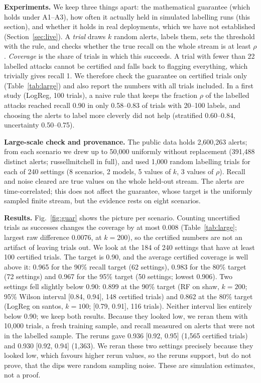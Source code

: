 \documentclass[conference]{IEEEtran}
\begin{document}
\textbf{Experiments.} We keep three things apart: the mathematical guarantee (which holds under
A1--A3), how often it actually held in simulated labelling runs (this section), and whether it
holds in real deployments, which we have not established (Section~\ref{sec:live}). A \emph{trial}
draws $k$ random alerts, labels them, sets the threshold with the rule, and checks whether the true
recall on the whole stream is at least $\rho$. \emph{Coverage} is the share of trials in which
this succeeds. A trial with fewer than 22 labelled attacks cannot be certified and falls back to
flagging everything, which trivially gives recall 1. We therefore check the guarantee on certified
trials only (Table~\ref{tab:large}) and also report the numbers with all trials included. In a first study (LogReg, 100 trials), a naive rule that keeps the fraction $\rho$ of the labelled attacks reached recall 0.90 in only
0.58--0.83 of trials with 20--100 labels, and choosing the alerts to label more cleverly did not help (stratified 0.60--0.84, uncertainty 0.50--0.75).



\textbf{Large-scale check and provenance.} The public data holds 2,600,263 alerts; from each
scenario we drew up to 50,000 uniformly without replacement (391,488 distinct alerts;
russellmitchell in full), and used 1,000 random labelling trials for each of 240 settings (8
scenarios, 2 models, 5 values of $k$, 3 values of $\rho$). Recall and noise cleared are true
values on the whole held-out stream. The alerts are time-correlated; this does not affect the guarantee,
whose target is the uniformly sampled finite stream, but the evidence rests on eight
scenarios.



\textbf{Results.} Fig.~\ref{fig:guar} shows the picture per scenario. Counting uncertified trials
as successes changes the coverage by at most 0.008 (Table~\ref{tab:large}; largest raw difference
0.0076, at $k=200$), so the certified numbers are not an artifact of leaving trials out. We look
at the 184 of 240 settings that have at least 100 certified trials. The target is 0.90, and the
average certified coverage is well above it: 0.965 for the 90\% recall target (62 settings), 0.983
for the 80\% target (72 settings) and 0.967 for the 95\% target (50 settings; lowest 0.906). Two
settings fell slightly below 0.90: 0.899 at the 90\% target (RF on shaw, $k=200$; 95\% Wilson
interval [0.84, 0.94], 148 certified trials) and 0.862 at the 80\% target (LogReg on santos,
$k=100$; [0.79, 0.91], 116 trials). Neither interval lies entirely below 0.90; we keep both results. Because they looked low, we reran them with 10,000 trials, a fresh training
sample, and recall measured on alerts that were not in the labelled sample. The reruns gave 0.936
[0.92, 0.95] (1,565 certified trials) and 0.930 [0.92, 0.94] (1,363). We reran these two settings
precisely because they looked low, which favours higher rerun values, so the reruns support, but
do not prove, that the dips were random sampling noise. These are simulation estimates, not a proof.
\end{document}
